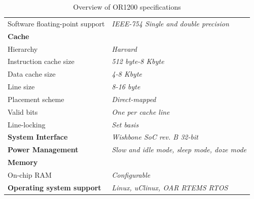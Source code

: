 \documentclass[a4paper,10pt]{article}
\numberwithin{figure}{section}
\numberwithin{table}{section}
\begin{document}
{\begin{table}
\begin{center}
\begin{tabular}{ll}
\rowcolor{tcD}
Software floating-point support & \textit{IEEE-754 Single and double precision}\\
\rowcolor{tcC}
\textbf{Cache} &  \\
\rowcolor{tcD}
Hierarchy & \textit{Harvard}\\
\rowcolor{tcC}
Instruction cache
size & \textit{512 byte-8 Kbyte}\\
\rowcolor{tcD}
Data cache size & \textit{4-8 Kbyte}\\
\rowcolor{tcC}
Line size & \textit{8-16 byte}\\
\rowcolor{tcD}
Placement scheme & \textit{Direct-mapped}\\
\rowcolor{tcC}
Valid bits & \textit{One per cache line}\\
\rowcolor{tcD}
Line-locking & \textit{Set basis}\\
\rowcolor{tcC}
\textbf{System Interface} & \textit{Wishbone SoC rev. B 32-bit}\\
\rowcolor{tcD}
\textbf{Power Management} & \textit{Slow and idle mode, sleep mode, doze mode}\\
\rowcolor{tcC}
\textbf{Memory} &  \\
\rowcolor{tcD}
On-chip RAM & \textit{Configurable} \\
\rowcolor{tcC}
\textbf{Operating system
support} & \textit{Linux, uClinux, OAR RTEMS RTOS}\\
\end{tabular}
\end{center}
\caption{Overview of OR1200 specifications}
\end{table}
}%
\newpage
\end{document}
